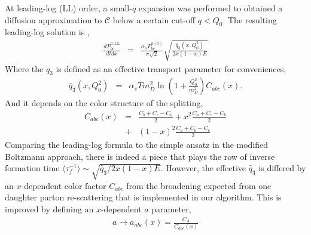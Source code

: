\documentclass[aps, prc, reprint, amsmath, groupedaddress, nofootinbib]{revtex4-1}
\begin{document}
At leading-log (LL) order, a small-$q$ expansion was performed to obtained a diffusion approximation to $\mathcal{C}$ below a certain cut-off $q<Q_0$.
The resulting leading-log solution is \cite{Arnold:2008zu},
\begin{eqnarray}\label{eq:AMY-LL}
\frac{dP_{bc}^{a,\textrm{LL}}}{dt dx} &=& \frac{\alpha_s P_{bc}^{a(0)}}{\pi\sqrt{2}}
\sqrt{\frac{\hat{q}_3(x, Q_0^2)}{2x(1-x)E}}
\end{eqnarray}
Where the $\hat{q}_3$ is defined as an effective transport parameter for conveniences,
\begin{eqnarray}
\hat{q}_3(x, Q_0^2) &=& \alpha_s T m_D^2 \ln\left(1+\frac{Q_0^2}{m_D^2}\right) C_{abc}(x).\label{eq:qhat3}
\end{eqnarray}
And it depends on the color structure of the splitting,
\begin{eqnarray}
C_{abc}(x) &=&  \frac{C_b+C_c-C_a}{2} + x^2 \frac{C_a+C_c-C_b}{2} \\\nonumber
&+& (1-x)^2\frac{C_a+C_b-C_c}{2}
\end{eqnarray}
Comparing the leading-log formula to the simple ansatz in the modified Boltzmann approach, there is indeed a piece that plays the row of inverse formation time $\langle\tau_f^{-1}\rangle \sim \sqrt{\hat{q}_3 / 2x(1-x)E}$. 
However, the effective $\hat{q}_3$ is differed by an $x$-dependent color factor $C_{abc}$ from the broadening expected from one daughter parton re-scattering that is implemented in our algorithm.
This is improved by defining an $x$-dependent $a$ parameter,
\begin{eqnarray}
a \rightarrow a_{abc}(x) = \frac{C_A}{C_{abc}(x)}
\end{eqnarray}
\end{document}
